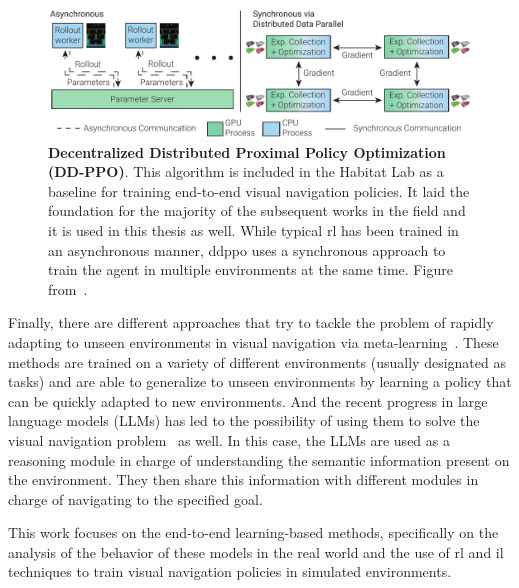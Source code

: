 \begin{figure}
    \centering
    \includegraphics[width=\textwidth]{figures/related_work/ddppo}
    \caption[Decentralized Distributed Proximal Policy Optimization (DD-PPO)]{\textbf{Decentralized Distributed Proximal Policy Optimization (DD-PPO)}.
    This algorithm is included in the Habitat Lab as a baseline for training end-to-end visual navigation policies.
    It laid the foundation for the majority of the subsequent works in the field and it is used in this thesis as well.
    While typical \acrshort{rl} has been trained in an asynchronous manner, \acrshort{ddppo} uses a synchronous approach to train the agent in multiple environments at the same time.
    Figure from~\cite{wijmans2020}.}
    \label{fig:ddppo}
\end{figure}

Finally, there are different approaches that try to tackle the problem of rapidly adapting to unseen environments in visual navigation via meta-learning~\cite{wortsman2019, luo2021, zhang2022}.
These methods are trained on a variety of different environments (usually designated as tasks) and are able to generalize to unseen environments by learning a policy that can be quickly adapted to new environments.
And the recent progress in large language models (LLMs) has led to the possibility of using them to solve the visual navigation problem~\cite{Huang2023, Zhou2023} as well.
In this case, the LLMs are used as a reasoning module in charge of understanding the semantic information present on the environment.
They then share this information with different modules in charge of navigating to the specified goal.

This work focuses on the end-to-end learning-based methods, specifically on the analysis of the behavior of these models in the real world and the use of \acrshort{rl} and \acrshort{il} techniques to train visual navigation policies in simulated environments.

